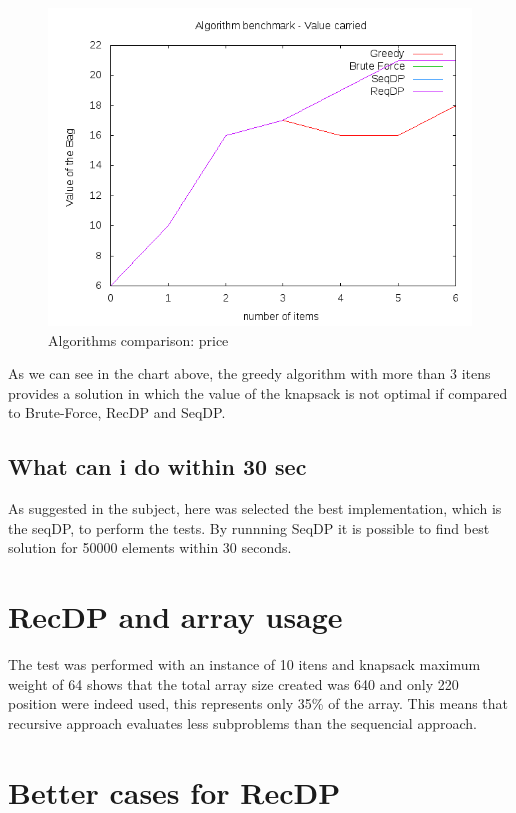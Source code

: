 \documentclass{article}
\begin{document}
\begin{figure} [H]
\includegraphics[scale=0.4]{report/price_analysis}
\caption{Algorithms comparison: price}
\label{report/price_analysis}
\end{figure}

As we can see in the chart above, the greedy algorithm with more than 3 itens provides a solution in which the value of the 
knapsack is not optimal if compared to Brute-Force, RecDP and SeqDP.

\subsection{What can i do within 30 sec}

As suggested in the subject, here was selected the best implementation, which is the seqDP, to perform the tests. By runnning SeqDP it is 
possible to find best solution for 50000 elements within 30 seconds.

\section{RecDP and array usage}

The test was performed with an instance of 10 itens and knapsack maximum weight of 64 shows that the total array size created was
640 and only 220 position were indeed used, this represents only 35\% of the array. This means that recursive approach evaluates
less subproblems than the sequencial approach.

\section{Better cases for RecDP}
\end{document}
